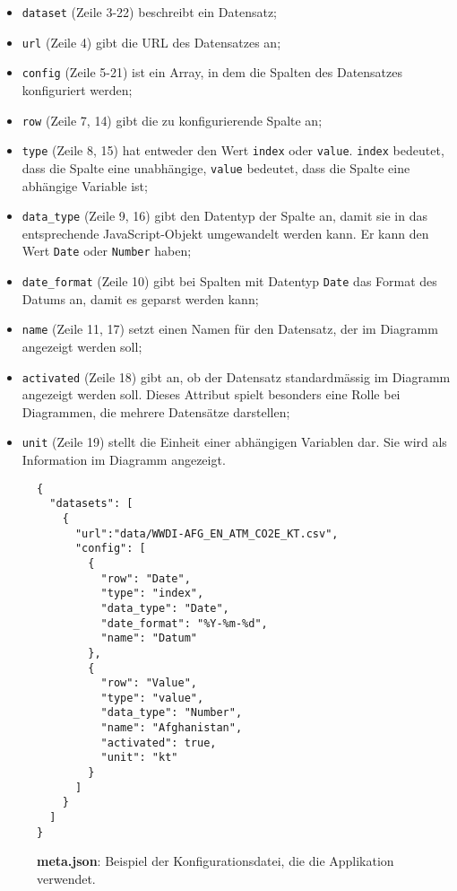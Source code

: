 \begin{itemize}
	\item \texttt{dataset} (Zeile 3-22) beschreibt ein Datensatz;
	\item \texttt{url} (Zeile 4) gibt die URL des Datensatzes an;
	\item \texttt{config} (Zeile 5-21) ist ein Array, in dem die Spalten des Datensatzes konfiguriert werden;
	\item \texttt{row} (Zeile 7, 14) gibt die zu konfigurierende Spalte an;
	\item \texttt{type} (Zeile 8, 15) hat entweder den Wert \texttt{index} oder \texttt{value}. \texttt{index} bedeutet, dass die Spalte eine unabhängige, \texttt{value} bedeutet, dass die Spalte eine abhängige Variable ist;
	\item \texttt{data\_type} (Zeile 9, 16) gibt den Datentyp der Spalte an, damit sie in das entsprechende JavaScript-Objekt umgewandelt werden kann. Er kann den Wert \texttt{Date} oder \texttt{Number} haben;
	\item \texttt{date\_format} (Zeile 10) gibt bei Spalten mit Datentyp \texttt{Date} das Format des Datums an, damit es geparst werden kann;
	\item \texttt{name} (Zeile 11, 17) setzt einen Namen für den Datensatz, der im Diagramm angezeigt werden soll;
	\item \texttt{activated} (Zeile 18) gibt an, ob der Datensatz standardmässig im Diagramm angezeigt werden soll. Dieses Attribut spielt besonders eine Rolle bei Diagrammen, die mehrere Datensätze darstellen;
	\item \texttt{unit} (Zeile 19) stellt die Einheit einer abhängigen Variablen dar. Sie wird als Information im Diagramm angezeigt.
\end{itemize}

\begin{figure}[!htbp]
	\centering
	\begin{verbatim}
{
  "datasets": [
    {
      "url":"data/WWDI-AFG_EN_ATM_CO2E_KT.csv",
      "config": [
        {
          "row": "Date",
          "type": "index",
          "data_type": "Date",
          "date_format": "%Y-%m-%d",
          "name": "Datum"
        },
        {
          "row": "Value",
          "type": "value",
          "data_type": "Number",
          "name": "Afghanistan",
          "activated": true,
          "unit": "kt"
        }
      ]
    }
  ]	
}
	\end{verbatim}
	
	
	\caption[Beispiel der Konfigurationsdatei: meta.json]{\textbf{meta.json}: Beispiel der Konfigurationsdatei, die die Applikation verwendet.}
	\label{fig:meta}
\end{figure}

